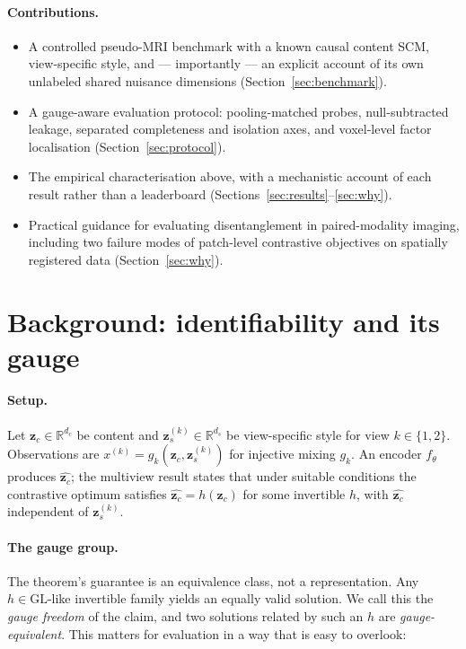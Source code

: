 \documentclass[11pt]{article}
\newcommand{\zc}{\mathbf{z}_c}
\newcommand{\zs}{\mathbf{z}_s}
\newcommand{\R}{\mathbb{R}}
\begin{document}
\paragraph{Contributions.}
\begin{itemize}
\item A controlled pseudo-MRI benchmark with a known causal content SCM,
view-specific style, and --- importantly --- an explicit account of its own
unlabeled shared nuisance dimensions (Section~\ref{sec:benchmark}).
\item A gauge-aware evaluation protocol: pooling-matched probes, null-subtracted
leakage, separated completeness and isolation axes, and voxel-level factor
localisation (Section~\ref{sec:protocol}).
\item The empirical characterisation above, with a mechanistic account of each
result rather than a leaderboard (Sections~\ref{sec:results}--\ref{sec:why}).
\item Practical guidance for evaluating disentanglement in paired-modality
imaging, including two failure modes of patch-level contrastive objectives on
spatially registered data (Section~\ref{sec:why}).
\end{itemize}

\section{Background: identifiability and its gauge}
\label{sec:gauge-theory}

\paragraph{Setup.} Let $\zc \in \R^{d_c}$ be content and $\zs^{(k)} \in
\R^{d_s}$ be view-specific style for view $k \in \{1,2\}$. Observations are
$x^{(k)} = g_k(\zc, \zs^{(k)})$ for injective mixing $g_k$. An encoder
$f_\theta$ produces $\hat{\zc}$; the multiview result states that under
suitable conditions the contrastive optimum satisfies $\hat{\zc} = h(\zc)$ for
some invertible $h$, with $\hat{\zc}$ independent of $\zs^{(k)}$.

\paragraph{The gauge group.} The theorem's guarantee is an equivalence class,
not a representation. Any $h \in \mathrm{GL}$-like invertible family yields an
equally valid solution. We call this the \emph{gauge freedom} of the claim, and
two solutions related by such an $h$ are \emph{gauge-equivalent}. This matters
for evaluation in a way that is easy to overlook:
\end{document}
